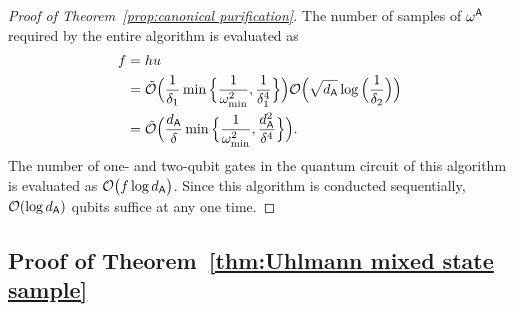 \begin{proof}[Proof of Theorem~\ref{prop:canonical purification}]
The number of samples of $\omega^{\mathsf{A}}$ required by the entire algorithm is evaluated as
\begin{align}
    f 
    &= hu \\ 
    &= \tilde{{\mathcal{O}}}\Big(\frac{1}{\delta_1}\min\Big\{\frac{1}{\omega_{\rm min}^2}, \frac{1}{\delta_1^4}\Big\}\Big){\mathcal{O}}\Big(\sqrt{d_{\mathsf{A}}}\log{\Big(\frac{1}{\delta_2}\Big)}\Big) \\
    &=\tilde{{\mathcal{O}}}\Big(\frac{d_{\mathsf{A}}}{\delta}\min\Big\{\frac{1}{\omega_{\rm min}^2}, \frac{d_{\mathsf{A}}^2}{\delta^4}\Big\}\Big).
\end{align}
The number of one- and two-qubit gates in the quantum circuit of this algorithm is evaluated as ${\mathcal{O}}\big(f\log{d_{\mathsf{A}}}\big)$.
Since this algorithm is conducted sequentially, ${\mathcal{O}}(\log{d_{\mathsf{A}}})$ qubits suffice at any one time.




\end{proof}












\subsection{Proof of Theorem~\ref{thm:Uhlmann mixed state sample}}
\label{sec:proof eval sample mixed}




